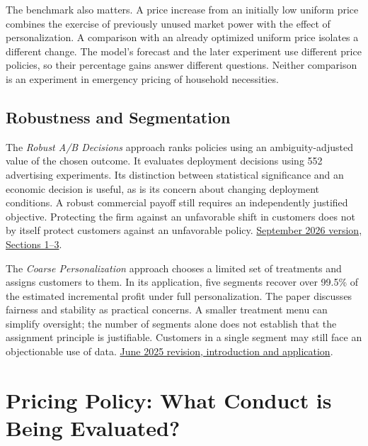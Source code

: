 The benchmark also matters. A price increase from an initially low
uniform price combines the exercise of previously unused market power
with the effect of personalization. A comparison with an already
optimized uniform price isolates a different change. The model's
forecast and the later experiment use different price policies, so their
percentage gains answer different questions. Neither comparison is an
experiment in emergency pricing of household necessities.

\hypertarget{M09-robustness-and-segmentation}{%
\subsection{Robustness and
Segmentation}\label{M09-robustness-and-segmentation}}

\noindent The \emph{Robust A/B Decisions} approach ranks policies using an
ambiguity-adjusted value of the chosen outcome. It evaluates deployment
decisions using 552 advertising experiments. Its distinction between
statistical significance and an economic decision is useful, as is its
concern about changing deployment conditions. A robust commercial payoff
still requires an independently justified objective. Protecting the firm
against an unfavorable shift in customers does not by itself protect
customers against an unfavorable policy.
\href{https://arxiv.org/abs/2609.07633}{September 2026 version, Sections
1--3}.

The \emph{Coarse Personalization} approach chooses a limited set of
treatments and assigns customers to them. In its application, five
segments recover over 99.5\% of the estimated incremental profit under
full personalization. The paper discusses fairness and stability as
practical concerns. A smaller treatment menu can simplify oversight; the
number of segments alone does not establish that the assignment
principle is justifiable. Customers in a single segment may still face
an objectionable use of data.
\href{https://arxiv.org/abs/2204.05793v4}{June 2025 revision,
introduction and application}.


\hypertarget{M09-pricing-policy-what-conduct-is-being-evaluated}{%
\section{Pricing Policy: What Conduct is Being
Evaluated?}\label{M09-pricing-policy-what-conduct-is-being-evaluated}}

